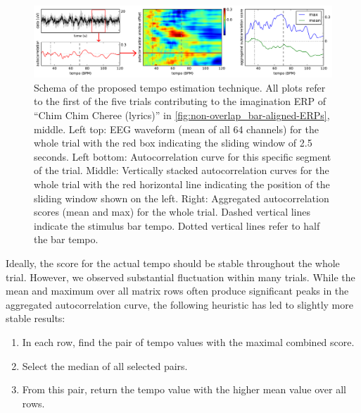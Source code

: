 \begin{figure}[t]
  \begin{center}
    \includegraphics[width=\textwidth,keepaspectratio=true]{Figures/sliding-window-analysis_arrow.pdf}
    \caption{%
Schema of the proposed tempo estimation technique.
All plots refer to the first of the five trials contributing to the imagination ERP of ``Chim Chim Cheree (lyrics)'' in  \autoref{fig:non-overlap_bar-aligned-ERPs}, middle.
Left top: EEG waveform (mean of all 64 channels) for the whole trial with the red box indicating the sliding window of 2.5 seconds.
Left bottom: Autocorrelation curve for this specific segment of the trial.
Middle: Vertically stacked autocorrelation curves for the whole trial with the red horizontal line indicating the position of the sliding window shown on the left.
Right: Aggregated autocorrelation scores (mean and max) for the whole trial.
Dashed vertical lines indicate the stimulus bar tempo.
Dotted vertical lines refer to half the bar tempo.
    }
    \label{fig:sliding-window-analysis}
  \end{center}
\end{figure}

Ideally, the score for the actual tempo should be stable throughout the whole trial.
However, we observed substantial fluctuation within many trials.
While the mean and maximum over all matrix rows often produce significant peaks in the aggregated autocorrelation curve, the following heuristic has led to slightly more stable results:
\begin{enumerate}
\item
        In each row, find the pair of tempo values with the maximal combined score.
\item
        Select the median of all selected pairs.
\item
        From this pair, return the tempo value with the higher mean value over
all rows.
\end{enumerate}

